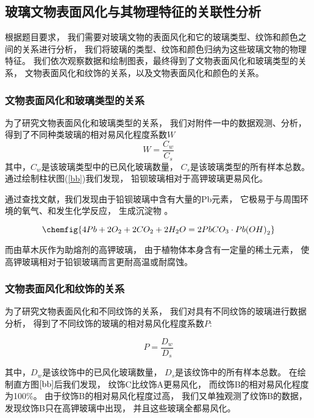 \documentclass[withoutpreface,bwprint]{cumcmthesis} %
\begin{document}
\subsection{玻璃文物表面风化与其物理特征的关联性分析}
根据题目要求，
我们需要对玻璃文物的表面风化和它的玻璃类型、纹饰和颜色之间的关系进行分析，
我们将玻璃的类型、纹饰和颜色归纳为这些玻璃文物的物理特征。
我们依次观察数据和绘制图表，最终得到了文物表面风化和玻璃类型的关系，
文物表面风化和纹饰的关系，以及文物表面风化和颜色的关系。

\subsubsection{文物表面风化和玻璃类型的关系}

为了研究文物表面风化和玻璃类型的关系，
我们对附件一中的数据观测、分析，
得到了不同种类玻璃的相对易风化程度系数$W$
\begin{equation}
	W = \dfrac{C_w}{C_s}
\end{equation}
其中，$C_w$是该玻璃类型中的已风化玻璃数量，
$C_s$是该玻璃类型的所有样本总数。通过绘制柱状图(\ref{bb})我们发现，
铅钡玻璃相对于高钾玻璃更易风化。

通过查找文献，我们发现由于铅钡玻璃中含有大量的Pb元素，
它极易于与周围环境的氧气、和发生化学反应，
生成沉淀物 \cite{yijianzhanguoshiqibaleng}。

\begin{equation}
	\chemfig{4Pb + 2O_2 + 2CO_2 + 2H_2O = 2PbCO_3 \cdot Pb{(}OH{)}_2}
\end{equation}

而由草木灰作为助熔剂的高钾玻璃，
由于植物体本身含有一定量的稀土元素，
使高钾玻璃相对于铅钡玻璃而言更耐高温或耐腐蚀\cite{gudaibolicailiao}\cite{wedepohl2010chemical}。

\subsubsection{文物表面风化和纹饰的关系}
为了研究文物表面风化和不同纹饰的关系，
我们对具有不同纹饰的玻璃进行数据分析，
得到了不同纹饰的玻璃的相对易风化程度系数$P$:

\begin{equation}
	P = \dfrac{D_w}{D_s}
\end{equation}

其中，$D_w$是该纹饰中的已风化玻璃数量，
$D_s$是该纹饰中的所有样本总数。
在绘制直方图$\ref{bb}$后我们发现，
纹饰C比纹饰A更易风化，
而纹饰B的相对易风化程度为100\%。
由于纹饰B的相对易风化程度过高，
我们又单独观测了纹饰B的数据，
发现纹饰B只在高钾玻璃中出现，
并且这些玻璃全都易风化。
\end{document}

